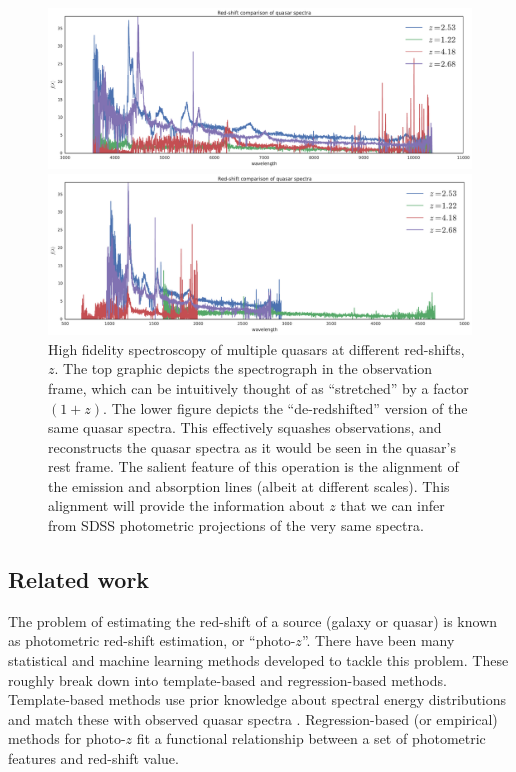 \documentclass{article}
\begin{document}
\begin{figure}[ht]
\vskip 0.2in
\begin{center}
\centerline{\includegraphics[width=2\columnwidth]{../figs/quasar_redshift_obs_frame}}
\centerline{\includegraphics[width=2\columnwidth]{../figs/quasar_redshift_rest_frame}}
\caption{High fidelity spectroscopy of multiple quasars at different red-shifts, $z$.  The top graphic depicts the spectrograph in the observation frame, which can be intuitively thought of as ``stretched'' by a factor $(1+z)$.  The lower figure depicts the ``de-redshifted'' version of the same quasar spectra.  This effectively squashes observations, and reconstructs the quasar spectra as it would be seen in the quasar's rest frame.  The salient feature of this operation is the alignment of the emission and absorption lines (albeit at different scales).  This alignment will provide the information about $z$ that we can infer from SDSS photometric projections of the very same spectra.}
\label{fig:frames}
\end{center}
\vskip -0.2in
\end{figure} 

\subsection{Related work}
The problem of estimating the red-shift of a source (galaxy or quasar) is known as photometric red-shift estimation, or
``photo-$z$''.  There have been many statistical and machine learning methods developed to tackle this problem. These roughly break down into template-based and regression-based methods. Template-based methods use prior knowledge about spectral energy distributions
and match these with observed quasar spectra \cite{walcher2011fitting}.  Regression-based (or empirical) methods for photo-$z$ fit a functional relationship between a set of photometric features and red-shift value.  
\end{document}
